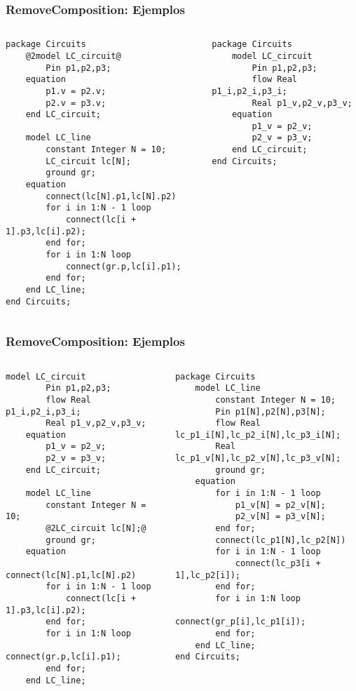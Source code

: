 \begin{frame}[fragile]
\frametitle{RemoveComposition: Ejemplos}
\begin{columns} 
\column[t]{7cm}  
\begin{lstlisting}[style=base,basicstyle=\scriptsize]
package Circuits
    @2model LC_circuit@
        Pin p1,p2,p3;
    equation
        p1.v = p2.v;
        p2.v = p3.v;
    end LC_circuit;
    
    model LC_line
        constant Integer N = 10;
        LC_circuit lc[N];
        ground gr;
    equation
        connect(lc[N].p1,lc[N].p2)      
        for i in 1:N - 1 loop
            connect(lc[i + 1].p3,lc[i].p2);
        end for;
        for i in 1:N loop
            connect(gr.p,lc[i].p1);
        end for;
    end LC_line;
end Circuits;
\end{lstlisting}

\column[t]{7cm}  
\begin{lstlisting}[style=base]
package Circuits
    model LC_circuit
        Pin p1,p2,p3;
        flow Real p1_i,p2_i,p3_i;
        Real p1_v,p2_v,p3_v;
    equation
        p1_v = p2_v;
        p2_v = p3_v;
    end LC_circuit;
end Circuits;
\end{lstlisting}
\end{columns}
\end{frame}

\begin{frame}[fragile]
\frametitle{RemoveComposition: Ejemplos}
\begin{columns} 
\column[t]{7cm}  
\begin{lstlisting}[style=base,basicstyle=\scriptsize]
    model LC_circuit
        Pin p1,p2,p3;
        flow Real p1_i,p2_i,p3_i;
        Real p1_v,p2_v,p3_v;
    equation
        p1_v = p2_v;
        p2_v = p3_v;
    end LC_circuit;
    
    model LC_line
        constant Integer N = 10;
        @2LC_circuit lc[N];@
        ground gr;
    equation
        connect(lc[N].p1,lc[N].p2)      
        for i in 1:N - 1 loop
            connect(lc[i + 1].p3,lc[i].p2);
        end for;
        for i in 1:N loop
            connect(gr.p,lc[i].p1);
        end for;
    end LC_line;
\end{lstlisting}

\column[t]{8cm}  
\begin{lstlisting}[style=base,basicstyle=\scriptsize]
package Circuits
    model LC_line
        constant Integer N = 10;
        Pin p1[N],p2[N],p3[N];
        flow Real lc_p1_i[N],lc_p2_i[N],lc_p3_i[N];
        Real lc_p1_v[N],lc_p2_v[N],lc_p3_v[N];
        ground gr;
    equation
        for i in 1:N - 1 loop
            p1_v[N] = p2_v[N];
            p2_v[N] = p3_v[N];
        end for;
        connect(lc_p1[N],lc_p2[N])      
        for i in 1:N - 1 loop
            connect(lc_p3[i + 1],lc_p2[i]);
        end for;
        for i in 1:N loop
            connect(gr_p[i],lc_p1[i]);
        end for;
    end LC_line;
end Circuits;
\end{lstlisting}
\end{columns}
\end{frame}


